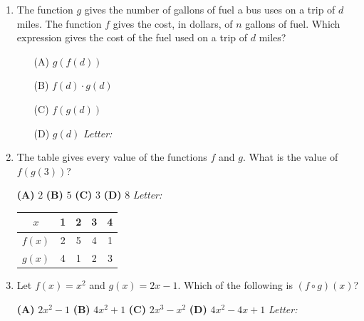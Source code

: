 \documentclass[10pt]{article}
\begin{document}
\begin{enumerate}[leftmargin=1.9em, itemsep=12pt]

\item The function $g$ gives the number of gallons of fuel a bus uses on a trip of $d$ miles.
      The function $f$ gives the cost, in dollars, of $n$ gallons of fuel. Which expression
      gives the cost of the fuel used on a trip of $d$ miles?
      \begin{enumerate}[leftmargin=2.6em, itemsep=2pt]
        \item[(A)] $g(f(d))$
        \item[(B)] $f(d) \cdot g(d)$
        \item[(C)] $f(g(d))$
        \item[(D)] $g(d)$ \hfill\textit{Letter:}~\gradedblank[id=ap1, type=choice, points=1, answer=C]{0.42in}{13pt}
      \end{enumerate}

\item \begin{minipage}[t]{0.52\linewidth}
      The table gives every value of the functions $f$ and $g$. What is the value of
      $f(g(3))$?

      \smallskip
      \textbf{(A)} $2$ \hspace{1.6em} \textbf{(B)} $5$ \hspace{1.6em}
      \textbf{(C)} $3$ \hspace{1.6em} \textbf{(D)} $8$ \hfill\textit{Letter:}~\gradedblank[id=ap2, type=choice, points=1, answer=B]{0.42in}{13pt}
      \end{minipage}\hfill
      \begin{minipage}[t]{0.42\linewidth}
      \vspace{-2pt}
      \centering
      \renewcommand{\arraystretch}{1.3}
      \begin{tabular}{|c|c|c|c|c|}
      \hline
      $x$ & 1 & 2 & 3 & 4 \\
      \hline
      $f(x)$ & 2 & 5 & 4 & 1 \\
      \hline
      $g(x)$ & 4 & 1 & 2 & 3 \\
      \hline
      \end{tabular}
      \end{minipage}

\item Let $f(x) = x^2$ and $g(x) = 2x - 1$. Which of the following is $(f \circ g)(x)$?

      \smallskip
      \textbf{(A)} $2x^2 - 1$ \hspace{1.8em} \textbf{(B)} $4x^2 + 1$ \hspace{1.8em}
      \textbf{(C)} $2x^3 - x^2$ \hspace{1.8em} \textbf{(D)} $4x^2 - 4x + 1$ \hfill\textit{Letter:}~\gradedblank[id=ap3, type=choice, points=1, answer=D]{0.42in}{13pt}


\end{enumerate}
\end{document}
